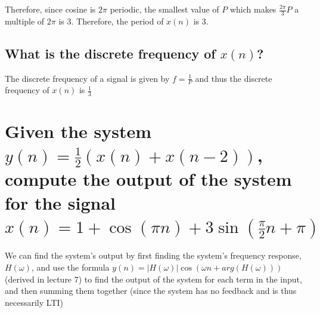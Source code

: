 \documentclass{article}
\renewcommand{\thesubsection}{\thesection.\alph{subsection}}
\begin{document}
Therefore, since cosine is $2\pi$ periodic, the smallest value of $P$ which makes $\frac{2\pi}{3}P$ a multiple of $2\pi$ is 3. Therefore, the period of $x(n)$ is 3.

\subsection[~\thesubsection]{What is the discrete frequency of $x(n)$?}

The discrete frequency of a signal is given by $f = \frac{1}{P}$ and thus the discrete frequency of $x(n)$ is $\frac{1}{3}$

\section[Question ~\thesection]{Given the system $y(n) = \frac{1}{2}(x(n) + x(n - 2))$, compute the output of the system for the signal $x(n) = 1 + \cos{({\pi}n)} + 3\sin{(\frac{\pi}{2}n + \pi)}$}

We can find the system's output by first finding the system's frequency response, $H(\omega)$, and use the formula $y(n) = |H(\omega)|\cos{({\omega}n + arg(H(\omega)))}$ (derived in lecture 7) to find the output of the system for each term in the input, and then summing them together (since the system has no feedback and is thus necessarily LTI)
\end{document}
